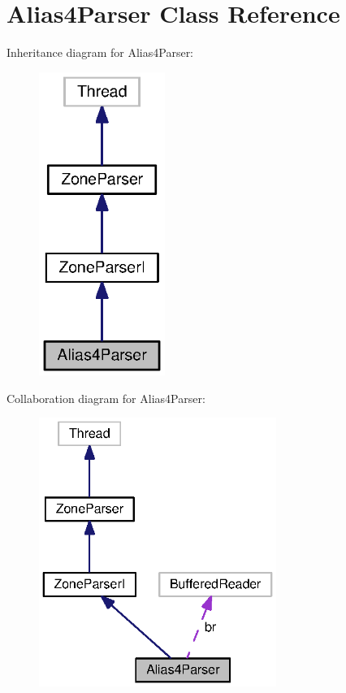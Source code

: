 \section{Alias4\-Parser Class Reference}
\label{classorg_1_1smallfoot_1_1parser_1_1zone_1_1Alias4Parser}


Inheritance diagram for Alias4\-Parser\-:\nopagebreak
\begin{figure}[H]
\begin{center}
\leavevmode
\includegraphics[width=116pt]{classorg_1_1smallfoot_1_1parser_1_1zone_1_1Alias4Parser__inherit__graph}
\end{center}
\end{figure}


Collaboration diagram for Alias4\-Parser\-:\nopagebreak
\begin{figure}[H]
\begin{center}
\leavevmode
\includegraphics[width=219pt]{classorg_1_1smallfoot_1_1parser_1_1zone_1_1Alias4Parser__coll__graph}
\end{center}
\end{figure}
